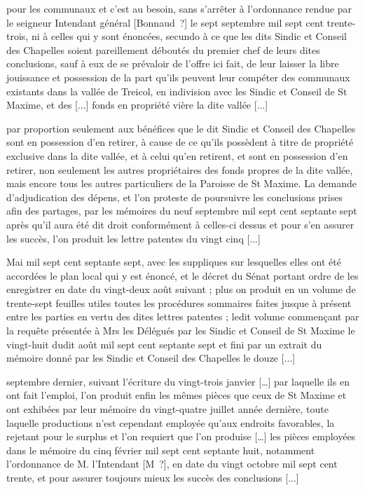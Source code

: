\documentclass[a4paper,twoside,openany]{article}
\begin{document}

pour les communaux et c’est au besoin, sans s’arrêter à l’ordonnance rendue par le seigneur Intendant général [Bonnaud~?] le sept septembre mil sept cent trente-trois, ni à celles qui y sont énoncées, secundo à ce que les dits Sindic et Conseil des Chapelles soient pareillement déboutés du premier chef de leurs dites conclusions, sauf à eux de se prévaloir de l’offre ici fait, de leur laisser la libre jouissance et possession de la part qu’ils peuvent leur compéter des communaux existants dans la vallée de Treicol, en indivision avec les Sindic et Conseil de St Maxime, et des [...] fonds en propriété vière la dite vallée [...]

par proportion seulement aux bénéfices que le dit Sindic et Conseil des Chapelles sont en possession d'en retirer, à cause de ce qu'ils possèdent à titre de propriété exclusive dans la dite vallée, et à celui qu'en retirent, et sont en possession d'en retirer, non seulement les autres propriétaires des fonds propres de la dite vallée, mais encore tous les autres particuliers de la Paroisse de St Maxime. La demande d'adjudication des dépens, et l'on proteste de poursuivre les conclusions prises afin des partages, par les mémoires du neuf septembre mil sept cent septante sept après qu’il aura été dit droit conformément à celles-ci dessus et pour s’en assurer les succès, l’on produit les lettre patentes du vingt cinq [...]


Mai mil sept cent septante sept, avec les suppliques sur lesquelles elles ont été accordées  le plan local qui y est énoncé, et le décret du Sénat portant ordre de les enregistrer en date du vingt-deux août suivant ; plus on produit en un volume de trente-sept feuilles utiles toutes les procédures sommaires faites jusque à présent entre les parties en vertu des dites lettres patentes ; ledit volume commençant par la requête présentée à Mrs les Délégués par les Sindic et Conseil de St Maxime le vingt-huit dudit août mil sept cent septante sept et fini par un extrait du mémoire donné par les Sindic et Conseil des Chapelles le douze [...]

septembre dernier, suivant l’écriture du vingt-trois janvier […] par laquelle ils en ont fait l'emploi, l'on produit enfin les mêmes pièces que ceux de St Maxime et ont exhibées par leur mémoire du vingt-quatre juillet année dernière, toute laquelle productions n’est cependant employée  qu'aux endroits favorables, la rejetant pour le surplus et l'on requiert que l’on produise […] les pièces employées dans le mémoire du cinq février mil sept cent septante huit, notamment l'ordonnance de M. l'Intendant [M~?], en date du vingt octobre mil sept cent trente, et pour assurer toujours mieux les succès des conclusions [...]
\end{document}
